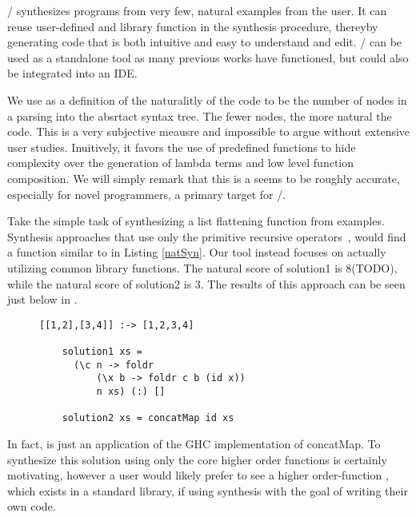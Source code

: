 \ourTool/ synthesizes programs from very few, natural examples from the user.
It can reuse user-defined and library function in the synthesis procedure, thereyby generating code that is both intuitive and easy to understand and edit.
\ourTool/ can be used as a standalone tool as many previous works have functioned, but could also be integrated into an IDE.


We use as a definition of the naturalitly of the code to be the number of nodes in a parsing into the absrtact syntax tree.
The fewer nodes, the more natural the code.
This is a very subjective meausre and impossible to argue without extensive user studies.
Inuitively, it favors the use of predefined functions to hide complexity over the generation of lambda terms and low level function composition.
We will simply remark that this is a seems to be roughly accurate, especially for novel programmers, a primary target for \ourTool/.


Take the simple task of synthesizing a list flattening function from examples.
Synthesis approaches that use only the primitive recursive operators~\cite{Osera:2015,FeserCD15}, would find a function similar to  in Listing \ref{natSyn}.
Our tool instead focuses on actually utilizing common library functions.
The natural score of solution1 is 8(TODO), while the natural score of solution2 is 3.
The results of this approach can be seen just below in .

\begin{figure}
  \begin{lstlisting}[caption=Low-level synthesis vs. Natural synthesis,label=natSyn]
    [[1,2],[3,4]] :-> [1,2,3,4]

    solution1 xs =
      (\c n -> foldr
          (\x b -> foldr c b (id x))
          n xs) (:) []

    solution2 xs = concatMap id xs
    \end{lstlisting}
\end{figure}

\noindent In fact,  is just an application of the GHC\cite{ghc} implementation of concatMap.
To synthesize this solution using only the core higher order functions is certainly motivating, however a user would likely prefer to see a higher order-function , which exists in a standard library, if using synthesis with the goal of writing their own code.

